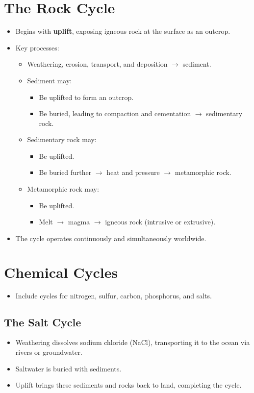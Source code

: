 \documentclass[12pt]{article}
\begin{document}
\section*{The Rock Cycle}
\begin{itemize}
    \item Begins with \textbf{uplift}, exposing igneous rock at the surface as an outcrop.
    \item Key processes:
    \begin{itemize}
        \item Weathering, erosion, transport, and deposition $\rightarrow$ sediment.
        \item Sediment may:
        \begin{itemize}
            \item Be uplifted to form an outcrop.
            \item Be buried, leading to compaction and cementation $\rightarrow$ sedimentary rock.
        \end{itemize}
        \item Sedimentary rock may:
        \begin{itemize}
            \item Be uplifted.
            \item Be buried further $\rightarrow$ heat and pressure $\rightarrow$ metamorphic rock.
        \end{itemize}
        \item Metamorphic rock may:
        \begin{itemize}
            \item Be uplifted.
            \item Melt $\rightarrow$ magma $\rightarrow$ igneous rock (intrusive or extrusive).
        \end{itemize}
    \end{itemize}
    \item The cycle operates continuously and simultaneously worldwide.
\end{itemize}

\section*{Chemical Cycles}
\begin{itemize}
    \item Include cycles for nitrogen, sulfur, carbon, phosphorus, and salts.
\end{itemize}

\subsection*{The Salt Cycle}
\begin{itemize}
    \item Weathering dissolves sodium chloride (NaCl), transporting it to the ocean via rivers or groundwater.
    \item Saltwater is buried with sediments.
    \item Uplift brings these sediments and rocks back to land, completing the cycle.
\end{itemize}
\end{document}
